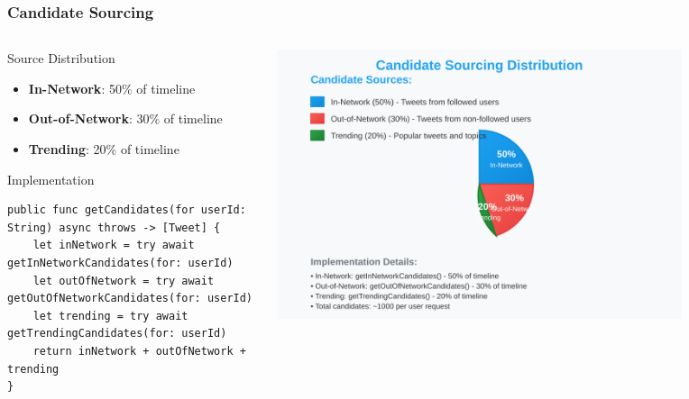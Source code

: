 \documentclass[aspectratio=169]{beamer}
\begin{document}
\begin{frame}
    \frametitle{Candidate Sourcing}
    \begin{columns}
        \begin{column}{0.6\textwidth}
            \begin{block}{Source Distribution}
                \begin{itemize}
                    \item \textbf{In-Network}: 50\% of timeline
                    \item \textbf{Out-of-Network}: 30\% of timeline
                    \item \textbf{Trending}: 20\% of timeline
                \end{itemize}
            \end{block}
            
            \begin{block}{Implementation}
                \begin{verbatim}
public func getCandidates(for userId: String) async throws -> [Tweet] {
    let inNetwork = try await getInNetworkCandidates(for: userId)
    let outOfNetwork = try await getOutOfNetworkCandidates(for: userId)
    let trending = try await getTrendingCandidates(for: userId)
    return inNetwork + outOfNetwork + trending
}
                \end{verbatim}
            \end{block}
        \end{column}
        \begin{column}{0.4\textwidth}
            \begin{center}
                \includegraphics[width=0.8\textwidth]{images/candidate-sourcing.svg}
            \end{center}
        \end{column}
    \end{columns}
\end{frame}
\end{document}
